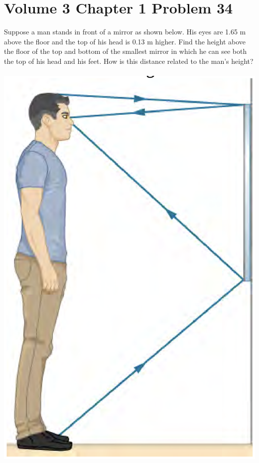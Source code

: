 \documentclass[11pt]{article}
\begin{document}
 \section*{Volume 3 Chapter 1 Problem 34}
  Suppose a man stands in front of a mirror as shown below. His eyes are 1.65 m above 
  the floor and the top of his head is 0.13 m higher. Find the height above the floor 
  of the top and bottom of the smallest mirror in which he can see both the top of his 
  head and his feet. How is this distance related to the man’s height? \\\\
  \includegraphics[scale=0.35]{3-1-34.png}
 \newpage
\end{document}
